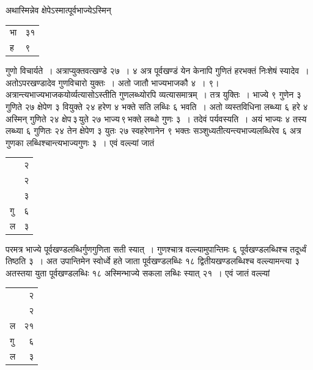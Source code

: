 \documentclass[11pt, openany]{book}
\begin{document}
{{अथास्मिन्नेव क्षेपेऽस्मात्पूर्वभाज्येऽस्मिन्

\vspace{-2mm}
\begin{table}[h!]
    \centering\s
    \begin{tabular}{ll}
भा &३१\\
ह &९
\end{tabular}
\end{table}
\vspace{-2mm}

\noindent गुणो विचार्यते~। अत्राप्युक्तवत्खण्डे २७~। ४ अत्र पूर्वखण्डं येन केनापि
गुणितं हरभक्तं निःशेषं स्यादेव~। अतोऽपरखण्डादेव गुणविचारो युक्तः~। अतो जातौ
भाज्यभाजकौ ४~। ९। अत्रान्त्यभाज्यभाजकयोर्व्यत्यासोऽस्तीति गुणलब्ध्योरपि
व्यत्यासमात्रम्~। 
तत्र युक्तिः~। भाज्ये ९ गुणेन ३ गुणिते २७ क्षेपेण ३ वियुक्ते २४ हरेण ४
भक्ते
\newpage
\noindent सति लब्धिः ६ भवति~। अतो व्यस्तविधिना लब्ध्या ६ हरे ४ अस्मिन् 
गुणिते २४ क्षेप\textendash \,३\textendash \,युते २७ भाज्य\textendash \,९\textendash \,भक्ते लब्धो गुणः ३~। तदेवं पर्यवस्यति~। अयं
भाज्यः ४ तस्य लब्ध्या ६ गुणितः २४ तेन क्षेपेण ३ युतः २७ स्वहरेणानेन ९ भक्तः सञ्शुध्यतीत्यन्त्यभाज्यलब्धिरेव ६ अत्र गुणका लब्धिश्चान्त्यभाज्यगुणः ३~। एवं वल्ल्यां जातं

\vspace{-2mm}
\begin{table}[h!]
    \centering\s
    \begin{tabular}{ll}
        &२\\
&२\\
&३\\
गु& ६\\
ल &३
    \end{tabular}
\end{table}
\vspace{-2mm}

\noindent परमत्र भाज्ये पूर्वखण्डलब्धिर्गुणगुणिता सती स्यात्~। गुणश्चात्र
वल्ल्यामुपान्तिमः ६ पूर्वखण्डलब्धिश्च तदूर्ध्वं तिष्ठति ३~। अत
उपान्तिमेन स्वोर्ध्वे हते जाता पूर्वखण्डलब्धिः १८ द्वितीयखण्डलब्धिश्च वल्ल्यामन्त्या ३ अतस्तया युता पूर्वखण्डलब्धिः १८ 
अस्मिन्भाज्ये सकला लब्धिः स्यात् २१~। एवं जातं वल्ल्यां

\vspace{-2mm}
\begin{table}[h!]
    \centering\s
    \begin{tabular}{lr}
       &२\\
&२\\
ल &२१\\
गु& ६\\
ल &३
    \end{tabular}
\end{table}
\vspace{-2mm}

}}
\end{document}
